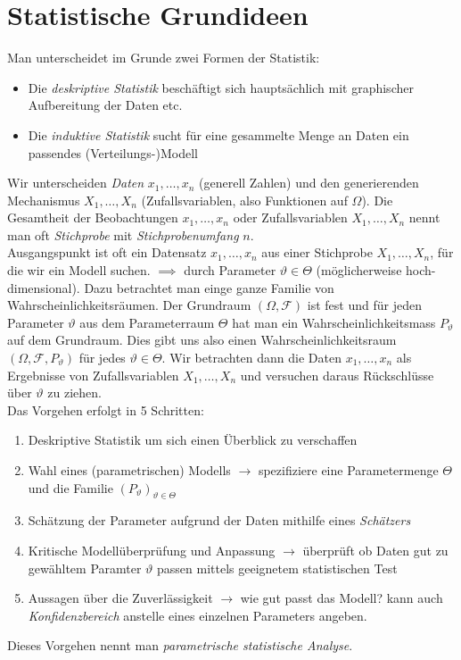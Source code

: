 \section{Statistische Grundideen}
\renewcommand{\theta}{\vartheta}
Man unterscheidet im Grunde zwei Formen der Statistik:
\begin{itemize}
\item Die \textit{deskriptive Statistik} beschäftigt sich hauptsächlich mit graphischer Aufbereitung der Daten etc.
\item Die \textit{induktive Statistik} sucht für eine gesammelte Menge an Daten ein passendes (Verteilungs-)Modell
\end{itemize}
Wir unterscheiden \textit{Daten} $x_1,\dots,x_n$ (generell Zahlen) und den generierenden Mechanismus $X_1,\dots,X_n$ (Zufallsvariablen, also Funktionen auf $\Omega$). Die Gesamtheit der Beobachtungen $x_1,\dots,x_n$ oder Zufallsvariablen $X_1,\dots,X_n$ nennt man oft \textit{Stichprobe} mit \textit{Stichprobenumfang} $n$.\\

Ausgangspunkt ist oft ein Datensatz $x_1,\dots,x_n$ aus einer Stichprobe $X_1,\dots,X_n$, für die wir ein Modell suchen. $\implies$ durch Parameter $\theta \in \Theta$ (möglicherweise hoch-dimensional). Dazu betrachtet man einge ganze Familie von Wahrscheinlichkeitsräumen. Der Grundraum $(\Omega, \mathcal{F})$ ist fest und für jeden Parameter $\theta$ aus dem Parameterraum $\Theta$ hat man ein Wahrscheinlichkeitsmass $P_\theta$ auf dem Grundraum. Dies gibt uns also einen Wahrscheinlichkeitsraum $(\Omega, \mathcal{F}, P_\theta)$ für jedes $\theta\in\Theta$. Wir betrachten dann die Daten $x_1,\dots,x_n$ als Ergebnisse von Zufallsvariablen $X_1,\dots,X_n$ und versuchen daraus Rückschlüsse über $\theta$ zu ziehen.\\

Das Vorgehen erfolgt in 5 Schritten:
\begin{enumerate}
\item Deskriptive Statistik um sich einen Überblick zu verschaffen
\item Wahl eines (parametrischen) Modells $\to$ spezifiziere eine Parametermenge $\Theta$ und die Familie $(P_\theta)_{\theta \in \Theta}$
\item Schätzung der Parameter aufgrund der Daten mithilfe eines \textit{Schätzers}
\item Kritische Modellüberprüfung und Anpassung $\to$ überprüft ob Daten gut zu gewähltem Paramter $\theta$ passen mittels geeignetem statistischen Test
\item Aussagen über die Zuverlässigkeit $\to$ wie gut passt das Modell? kann auch \textit{Konfidenzbereich} anstelle eines einzelnen Parameters angeben.
\end{enumerate}
Dieses Vorgehen nennt man \textit{parametrische statistische Analyse}.